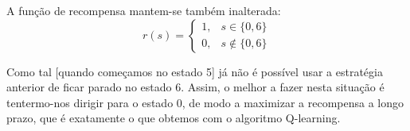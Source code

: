 \documentclass[a4paper,twocolumn]{article}
\begin{document}
    A função de recompensa mantem-se também inalterada:
     \[
        r(s) = \left\{
        \begin{array}{ll}
              1, & s \in \{0,6\} \\
              0, & s \notin \{0,6\}
        \end{array}
        \right.
    \]

    Como tal [quando começamos no estado 5] já não é possível usar a estratégia anterior de ficar parado no estado 6.
    Assim, o melhor a fazer nesta situação é tentermo-nos dirigir para o estado 0, de modo a maximizar a recompensa a
    longo prazo, que é exatamente o que obtemos com o algoritmo Q-learning.
\end{document}
